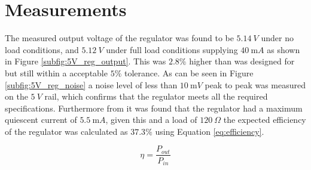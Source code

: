\section{Measurements} \label{sec:measurements_linear}
The measured output voltage of the regulator was found to be $\SI{5.14}{V}$ under no load conditions, and $\SI{5.12}{V}$ under full load conditions supplying $\SI{40}{\milli A}$ as shown in Figure \ref{subfig:5V_reg_output}. This was $2.8\%$ higher than was designed for but still within a acceptable $5\%$ tolerance. As can be seen in Figure \ref{subfig:5V_reg_noise} a noise level of less than $\SI{10}{\milli V}$ peak to peak was measured on the $\SI{5}{V}$ rail, which confirms that the regulator meets all the required specifications. \newline
Furthermore from \cite{reg78L05:2002} it was found that the regulator had a maximum quiescent current of $\SI{5.5}{\milli A}$, given this and a load of $\SI{120}{\Omega}$ the expected efficiency of the regulator was calculated as $37.3\%$ using Equation \ref{eq:efficiency}.

\begin{equation}
   \eta = \frac{P_{out}}{P_{in}}
   \label{eq:efficiency}
\end{equation}

